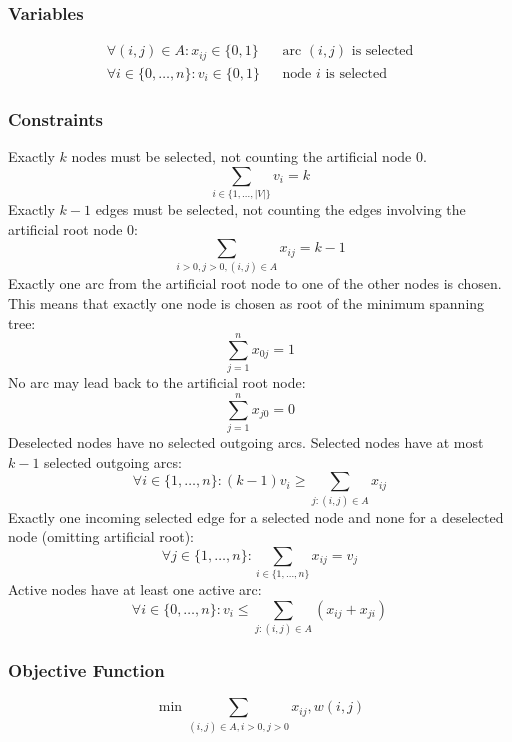 \documentclass{article}
\begin{document}
\subsubsection{Variables}
\begin{eqnarray}
\forall(i,j)\in A: x_{ij} \in \{0,1\}  && \text{arc $(i,j)$ is selected} \\
\forall i \in \{0,\ldots,n\}: v_i \in \{0, 1\} && \text{node $i$ is selected} 
\end{eqnarray}
\subsubsection{Constraints}
Exactly $k$ nodes must be selected, not counting the artificial node $0$.
\begin{equation}
\sum_{i\in\{1,\ldots,|V|\}} v_i = k
\end{equation}
Exactly $k-1$ edges must be selected, not counting the edges involving the artificial root node $0$:
\begin{equation}
\sum_{i>0, j>0, (i,j)\in A} x_{ij} = k - 1 
\end{equation}
Exactly one arc from the artificial root node to one of the other nodes is chosen. This means that exactly one node is chosen as root of the minimum spanning tree:
\begin{equation}
\sum_{j=1}^{n} x_{0j} = 1
\end{equation}
No arc may lead back to the artificial root node:
\begin{equation}
\sum_{j=1}^{n} x_{j0} = 0
\end{equation}
Deselected nodes have no selected outgoing arcs. Selected nodes have at most $k - 1$ selected outgoing arcs:
\begin{equation}
\forall i \in \{1,\ldots,n\}: (k-1)v_i \geq \sum_{j:(i,j)\in A} x_{ij}
\end{equation}
Exactly one incoming selected edge for a selected node and none for a deselected node (omitting artificial root):
\begin{equation}
\forall j\in\{1,\ldots,n\}: \sum_{i\in\{1,\ldots,n\}} x_{ij} = v_j
\end{equation}
Active nodes have at least one active arc:
\begin{equation}
\forall i\in\{0,\ldots,n\}:  v_i \leq \sum_{j:(i,j)\in A} (x_{ij} + x_{ji})
\end{equation}

\subsubsection{Objective Function}
\begin{equation}
\min \sum_{(i, j) \in A, i>0, j>0} x_{ij},w(i,j) 
\end{equation}
\end{document}
